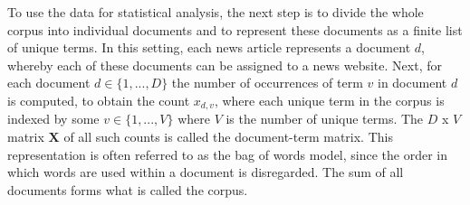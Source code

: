 \documentclass[12pt,a4paper,notitlepage]{article}
\begin{document}
To use the data for statistical analysis, the next step is to divide the whole corpus into individual documents and to represent these documents as a finite list of unique terms. In this setting, each news article represents a document $d$, whereby each of these documents can be assigned to a news website. Next, for each document $d \in \lbrace 1,...,D \rbrace$ the number of occurrences of term $v$ in document $d$ is computed, to obtain the count $x_{d,v}$, where each unique term in the corpus is indexed by some $v \in \lbrace 1,...,V \rbrace$ where $V$ is the number of unique terms. The $D$ x $V$ matrix $\boldsymbol{X}$ of all such counts is called the document-term matrix. This representation is often referred to as the bag of words model, since the order in which words are used within a document is disregarded. The sum of all documents forms what is called the corpus.
\end{document}
